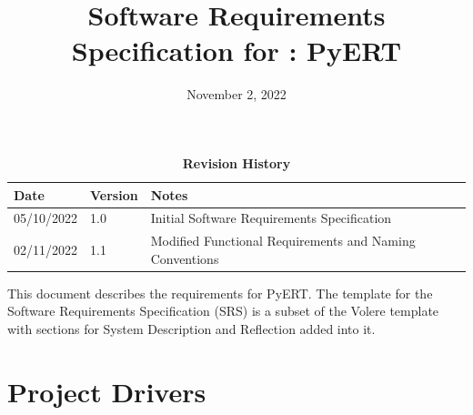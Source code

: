 \documentclass[12pt, titlepage]{article}
\begin{document}
\title{Software Requirements Specification for \progname: PyERT} 
\author{\authname}
\date{November 2, 2022}
	
\maketitle

\tableofcontents
\listoftables
\listoffigures

\begin{table}[H]
\caption{\bf Revision History}
\begin{tabularx}{\textwidth}{p{3cm}p{2cm}X}
\toprule {\bf Date} & {\bf Version} & {\bf Notes}\\
\midrule
05/10/2022 & 1.0 & Initial Software Requirements Specification\\
02/11/2022 & 1.1 & Modified Functional Requirements and Naming Conventions\\
\bottomrule
\end{tabularx}
\end{table}

\newpage


This document describes the requirements for PyERT. The template for the Software Requirements Specification (SRS) is a subset of the Volere template~\citep{RobertsonAndRobertson2012} with sections for System Description and Reflection added into it.

\section{Project Drivers}
\end{document}
